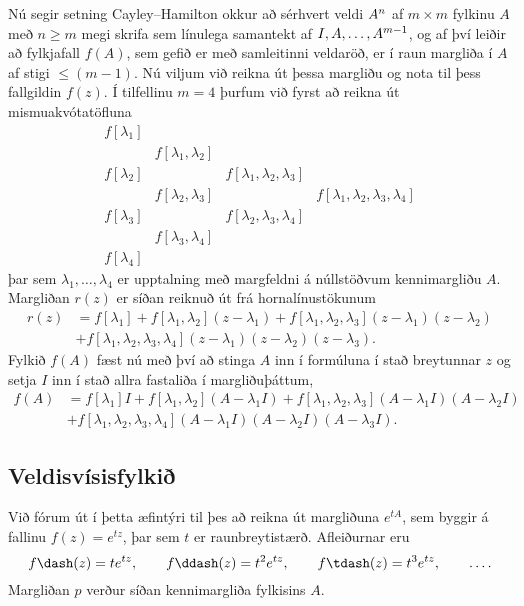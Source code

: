 \noindent
 Nú segir setning
Cayley--Hamilton okkur að sérhvert veldi $A\sp n$ af 
$m\times m$ fylkinu  $A$ með $n\geq
m$ megi skrifa sem línulega samantekt af $I,A,\dots, A\sp {m-1}$, og
af því leiðir að fylkjafall $f(A)$, sem gefið er
með samleitinni veldaröð, er í raun margliða í $A$ af stigi $\leq
(m-1)$.  Nú viljum við reikna út þessa margliðu og nota til þess
fallgildin $f(z)$.  Í tilfellinu $m=4$ þurfum við fyrst að reikna
út mismuakvótatöfluna
 $$\begin{matrix}
f[\lambda_1]\\
            &f[\lambda_1,\lambda_2]\\
f[\lambda_2]&                       &f[\lambda_1, \lambda_2, \lambda_3]\\
        &f[\lambda_2,\lambda_3]& &f[\lambda_1,\lambda_2,\lambda_3,\lambda_4]\\
f[\lambda_3]&                       &f[\lambda_2, \lambda_3, \lambda_4]\\
            &f[\lambda_3,\lambda_4]\\
f[\lambda_4]
\end{matrix}
 $$
þar sem $\lambda_1,\dots,\lambda_4$ er upptalning með margfeldni
á núllstöðvum kennimargliðu $A$.
Margliðan $r(z)$ er síðan reiknuð út frá hornalínustökunum
\begin{align*}
r(z)&=f[\lambda_1]+f[\lambda_1,\lambda_2](z-\lambda_1)
+f[\lambda_1, \lambda_2, \lambda_3](z-\lambda_1)(z-\lambda_2)\\
&+f[\lambda_1, \lambda_2, \lambda_3,\lambda_4]
(z-\lambda_1)(z-\lambda_2)(z-\lambda_3).
\end{align*}
Fylkið $f(A)$ fæst nú með því að stinga $A$ inn í formúluna í stað 
breytunnar $z$ og setja $I$ inn í stað allra fastaliða í
margliðuþáttum,
\begin{align*}
f(A)&=f[\lambda_1]I+f[\lambda_1,\lambda_2](A-\lambda_1I)
+f[\lambda_1, \lambda_2, \lambda_3](A-\lambda_1I)(A-\lambda_2I)\\
&+f[\lambda_1, \lambda_2, \lambda_3,\lambda_4]
(A-\lambda_1I)(A-\lambda_2I)(A-\lambda_3I).
\end{align*}

\subsection*{Veldisvísisfylkið}

Við fórum út í þetta æfintýri til þes að reikna út margliðuna
$e^{tA}$, sem byggir á fallinu $f(z)=e^{tz}$, þar sem $t$ er
raunbreytistærð.  Afleiðurnar eru
 $$f\dash(z)=te^{tz}, \qquad f\ddash(z)=t^2e^{tz}, \qquad
f\tdash(z)=t^3e^{tz}, \qquad \dots.
 $$
Margliðan $p$ verður síðan kennimargliða
fylkisins $A$.

